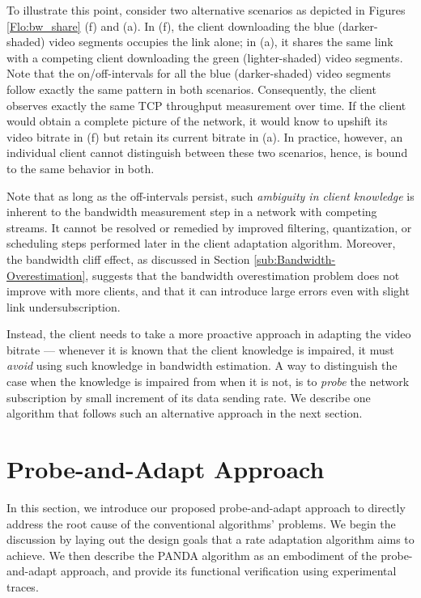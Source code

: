 \documentclass[conference]{IEEEtran}
\theoremstyle{plain}
\theoremstyle{definition}
\theoremstyle{plain}
\theoremstyle{plain}
\begin{document}
To illustrate this point, consider two alternative scenarios as depicted
in Figures \ref{Flo:bw_share} (f) and (a). In (f), the client downloading
the blue (darker-shaded) video segments occupies the link alone; in
(a), it shares the same link with a competing client downloading the
green (lighter-shaded) video segments. Note that the on/off-intervals
for all the blue (darker-shaded) video segments follow exactly the
same pattern in both scenarios. Consequently, the client observes
exactly the same TCP throughput measurement over time. If the client
would obtain a complete picture of the network, it would know to upshift
its video bitrate in (f) but retain its current bitrate in (a). In
practice, however, an individual client cannot distinguish between
these two scenarios, hence, is bound to the same behavior in both. 

Note that as long as the off-intervals persist, such \emph{ambiguity
in client knowledge} is inherent to the bandwidth measurement step
in a network with competing streams. It cannot be resolved or remedied
by improved filtering, quantization, or scheduling steps performed
later in the client adaptation algorithm. Moreover, the bandwidth
cliff effect, as discussed in Section \ref{sub:Bandwidth-Overestimation},
suggests that the bandwidth overestimation problem does not improve
with more clients, and that it can introduce large errors even with
slight link undersubscription.

Instead, the client needs to take a more proactive approach in adapting
the video bitrate --- whenever it is known that the client knowledge
is impaired, it must \emph{avoid} using such knowledge in bandwidth
estimation. A way to distinguish the case when the knowledge is impaired
from when it is not, is to \emph{probe} the network subscription by
small increment of its data sending rate. We describe one algorithm
that follows such an alternative approach in the next section.




\section{Probe-and-Adapt Approach \label{sec:Proposed-Rate-Adaptation}}

In this section, we introduce our proposed probe-and-adapt approach
to directly address the root cause of the conventional algorithms'
problems. We begin the discussion by laying out the design goals that
a rate adaptation algorithm aims to achieve. We then describe the
PANDA algorithm as an embodiment of the probe-and-adapt approach,
and provide its functional verification using experimental traces.
\end{document}
